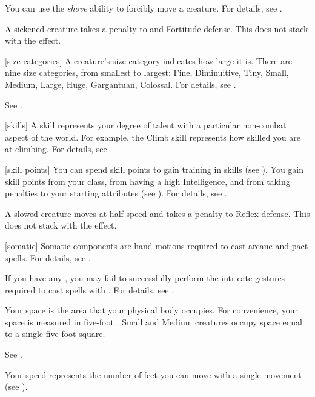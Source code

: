  You can use the \textit{shove} ability to forcibly move a creature.
For details, see .

 A sickened creature takes a  penalty to  and Fortitude defense.
This does not stack with the  effect.

[size categories] A creature's size category indicates how large it is.
There are nine size categories, from smallest to largest: Fine, Diminuitive, Tiny, Small, Medium, Large, Huge, Gargantuan, Colossal.
For details, see .

 See .

[skills] A skill represents your degree of talent with a particular non-combat aspect of the world.
For example, the Climb skill represents how skilled you are at climbing.
For details, see .

[skill points] You can spend skill points to gain training in skills (see ).
You gain skill points from your class, from having a high Intelligence, and from taking penalties to your starting attributes (see ).
For details, see .

 A slowed creature moves at half speed and takes a  penalty to Reflex defense.
This does not stack with the  effect.

[somatic] Somatic components are hand motions required to cast arcane and pact spells.
For details, see .

 If you have any , you may fail to successfully perform the intricate gestures required to cast spells with .
For details, see .

 Your space is the area that your physical body occupies.
For convenience, your space is measured in five-foot .
Small and Medium creatures occupy space equal to a single five-foot square.

 See .

 Your speed represents the number of feet you can move with a single movement (see ).

